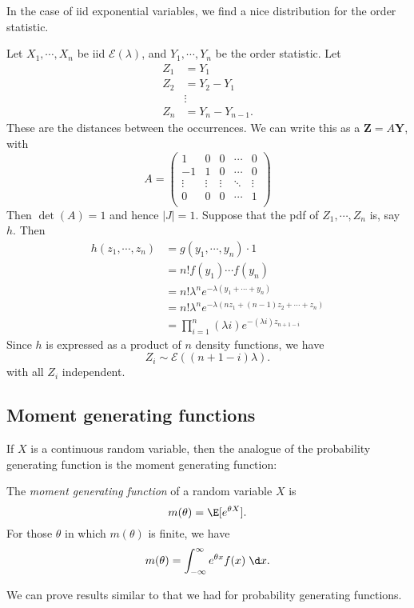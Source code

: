 \documentclass[a4paper]{article}
\begin{document}
In the case of iid exponential variables, we find a nice distribution for the order statistic.
\begin{eg}
  Let $X_1, \cdots, X_n$ be iid $\mathcal{E}(\lambda)$, and $Y_1, \cdots, Y_n$ be the order statistic. Let
  \begin{align*}
    Z_1 &= Y_1\\
    Z_2 &= Y_2 - Y_1\\
    &\vdots\\
    Z_n &= Y_n - Y_{n - 1}.
  \end{align*}
  These are the distances between the occurrences. We can write this as a $\mathbf{Z} = A\mathbf{Y}$, with
  \[
    A =
    \begin{pmatrix}
      1 & 0 & 0 & \cdots& 0\\
      -1 & 1 & 0 & \cdots & 0\\
      \vdots & \vdots & \vdots & \ddots & \vdots\\
      0 & 0 & 0 & \cdots & 1\\
    \end{pmatrix}
  \]
  Then $\det (A) = 1$ and hence $|J| = 1$. Suppose that the pdf of $Z_1, \cdots, Z_n$ is, say $h$. Then
  \begin{align*}
    h(z_1, \cdots, z_n) &= g(y_1, \cdots, y_n)\cdot 1\\
    &= n!f(y_1) \cdots f(y_n)\\
    &= n!\lambda^n e^{-\lambda (y_1 + \cdots + y_n)}\\
    &= n!\lambda^n e^{-\lambda (nz_1 + (n - 1)z_2 + \cdots + z_n)}\\
    &= \prod_{i = 1}^n (\lambda i)e^{-(\lambda i)z_{n + 1 - i}}
  \end{align*}
  Since $h$ is expressed as a product of $n$ density functions, we have
  \[
    Z_i \sim \mathcal{E}((n + 1 - i)\lambda).
  \]
  with all $Z_i$ independent.
\end{eg}


\subsection{Moment generating functions}
If $X$ is a continuous random variable, then the analogue of the probability generating function is the moment generating function:
\begin{defi}
  The \emph{moment generating function} of a random variable $X$ is
  \[
    m(\theta) = \E[e^{\theta X}].
  \]
  For those $\theta$ in which $m(\theta)$ is finite, we have
  \[
    m(\theta) = \int_{-\infty}^\infty e^{\theta x}f(x)\;\d x.
  \]
\end{defi}
We can prove results similar to that we had for probability generating functions.
\end{document}
